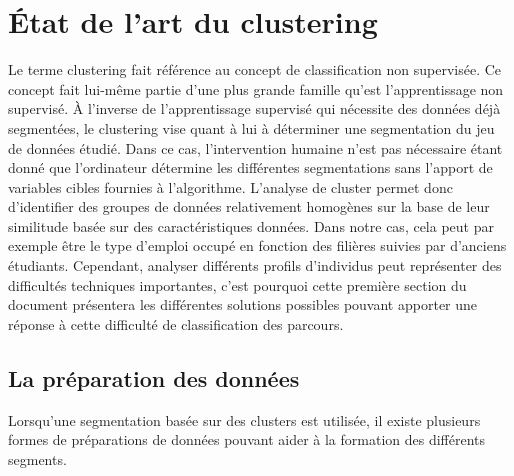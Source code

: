 \documentclass[memoire.tex]{subfiles}
\begin{document}
\chapter{État de l'art du clustering}
Le terme clustering fait référence au concept de classification non supervisée. Ce concept fait lui-même partie d'une plus grande famille qu'est l'apprentissage non supervisé. À l'inverse de l'apprentissage supervisé qui nécessite des données déjà segmentées, le clustering vise quant à lui à déterminer une segmentation du jeu de données étudié. Dans ce cas, l'intervention humaine n'est pas nécessaire étant donné  que l'ordinateur détermine les différentes segmentations sans l'apport de variables cibles fournies à l'algorithme.
L'analyse de cluster permet donc d'identifier des groupes de données relativement homogènes sur la base de leur similitude basée sur des caractéristiques données. Dans notre cas, cela peut par exemple être le type d'emploi occupé en fonction des filières suivies par d'anciens étudiants. Cependant, analyser différents profils d'individus peut représenter des difficultés techniques importantes, c'est pourquoi cette première section du document présentera les différentes solutions possibles pouvant apporter une réponse à cette difficulté de classification des parcours.
\section{La préparation des données}
Lorsqu'une segmentation basée sur des clusters est utilisée, il existe plusieurs formes de préparations de données pouvant aider à la formation des différents segments. 
\end{document}
